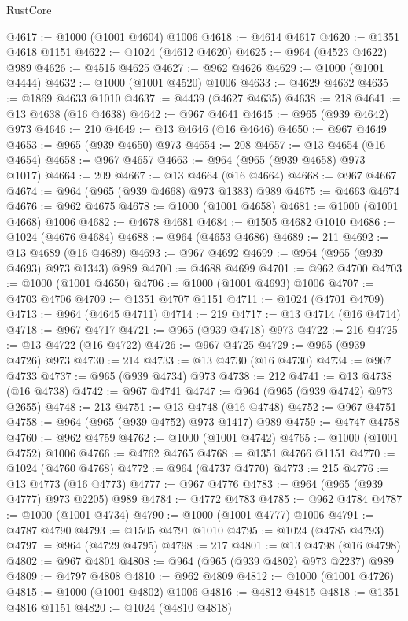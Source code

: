 \begin{lexlean}{RustCore}
\begin{coremodule}
@4617 := @1000 (@1001 @4604) @1006
@4618 := @4614 @4617
@4620 := @1351 @4618 @1151
@4622 := @1024 (@4612 @4620)
@4625 := @964 (@4523 @4622) @989
@4626 := @4515 @4625
@4627 := @962 @4626
@4629 := @1000 (@1001 @4444)
@4632 := @1000 (@1001 @4520) @1006
@4633 := @4629 @4632
@4635 := @1869 @4633 @1010
@4637 := @4439 (@4627 @4635)
@4638 := 218
@4641 := @13 @4638 (@16 @4638)
@4642 := @967 @4641
@4645 := @965 (@939 @4642) @973
@4646 := 210
@4649 := @13 @4646 (@16 @4646)
@4650 := @967 @4649
@4653 := @965 (@939 @4650) @973
@4654 := 208
@4657 := @13 @4654 (@16 @4654)
@4658 := @967 @4657
@4663 := @964 (@965 (@939 @4658) @973 @1017)
@4664 := 209
@4667 := @13 @4664 (@16 @4664)
@4668 := @967 @4667
@4674 := @964 (@965 (@939 @4668) @973 @1383) @989
@4675 := @4663 @4674
@4676 := @962 @4675
@4678 := @1000 (@1001 @4658)
@4681 := @1000 (@1001 @4668) @1006
@4682 := @4678 @4681
@4684 := @1505 @4682 @1010
@4686 := @1024 (@4676 @4684)
@4688 := @964 (@4653 @4686)
@4689 := 211
@4692 := @13 @4689 (@16 @4689)
@4693 := @967 @4692
@4699 := @964 (@965 (@939 @4693) @973 @1343) @989
@4700 := @4688 @4699
@4701 := @962 @4700
@4703 := @1000 (@1001 @4650)
@4706 := @1000 (@1001 @4693) @1006
@4707 := @4703 @4706
@4709 := @1351 @4707 @1151
@4711 := @1024 (@4701 @4709)
@4713 := @964 (@4645 @4711)
@4714 := 219
@4717 := @13 @4714 (@16 @4714)
@4718 := @967 @4717
@4721 := @965 (@939 @4718) @973
@4722 := 216
@4725 := @13 @4722 (@16 @4722)
@4726 := @967 @4725
@4729 := @965 (@939 @4726) @973
@4730 := 214
@4733 := @13 @4730 (@16 @4730)
@4734 := @967 @4733
@4737 := @965 (@939 @4734) @973
@4738 := 212
@4741 := @13 @4738 (@16 @4738)
@4742 := @967 @4741
@4747 := @964 (@965 (@939 @4742) @973 @2655)
@4748 := 213
@4751 := @13 @4748 (@16 @4748)
@4752 := @967 @4751
@4758 := @964 (@965 (@939 @4752) @973 @1417) @989
@4759 := @4747 @4758
@4760 := @962 @4759
@4762 := @1000 (@1001 @4742)
@4765 := @1000 (@1001 @4752) @1006
@4766 := @4762 @4765
@4768 := @1351 @4766 @1151
@4770 := @1024 (@4760 @4768)
@4772 := @964 (@4737 @4770)
@4773 := 215
@4776 := @13 @4773 (@16 @4773)
@4777 := @967 @4776
@4783 := @964 (@965 (@939 @4777) @973 @2205) @989
@4784 := @4772 @4783
@4785 := @962 @4784
@4787 := @1000 (@1001 @4734)
@4790 := @1000 (@1001 @4777) @1006
@4791 := @4787 @4790
@4793 := @1505 @4791 @1010
@4795 := @1024 (@4785 @4793)
@4797 := @964 (@4729 @4795)
@4798 := 217
@4801 := @13 @4798 (@16 @4798)
@4802 := @967 @4801
@4808 := @964 (@965 (@939 @4802) @973 @2237) @989
@4809 := @4797 @4808
@4810 := @962 @4809
@4812 := @1000 (@1001 @4726)
@4815 := @1000 (@1001 @4802) @1006
@4816 := @4812 @4815
@4818 := @1351 @4816 @1151
@4820 := @1024 (@4810 @4818)

\end{coremodule}
\end{lexlean}
